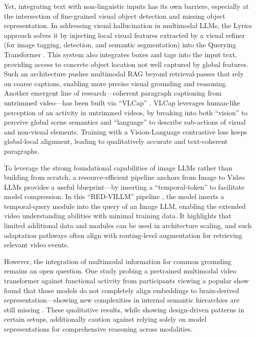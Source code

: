 \documentclass[11pt]{article}
\begin{document}
Yet, integrating text with non-linguistic inputs has its own barriers, especially at the intersection of fine-grained visual object detection and missing object representation. In addressing visual hallucination in multimodal LLMs, the Lyrics approach solves it by injecting local visual features extracted by a visual refiner (for image tagging, detection, and semantic segmentation) into the Querying Transformer \cite{ref200}. This system also integrates boxes and tags into the input text, providing access to concrete object location not well captured by global features. Such an architecture pushes multimodal RAG beyond retrieval-passes that rely on coarse captions, enabling more precise visual grounding and reasoning. Another emergent line of research---coherent paragraph captioning from untrimmed video---has been built via ``VLCap'' \cite{ref201}. VLCap leverages human-like perception of an activity in untrimmed videos, by breaking into both ``vision'' to perceive global scene semantics and ``language'' to describe sub-actions of visual and non-visual elements. Training with a Vision-Language contrastive loss keeps global-local alignment, leading to qualitatively accurate and text-coherent paragraphs.

To leverage the strong foundational capabilities of image LLMs rather than building from scratch, a resource-efficient pipeline anchors from Image to Video LLMs provides a useful blueprint---by inserting a ``temporal-token'' to facilitate model compression. In this ``RED-VILLM'' pipeline \cite{ref202}, the model inserts a temporal-query module into the query of an Image LLM, enabling the extended video understanding abilities with minimal training data. It highlights that limited additional data and modules can be used in architecture scaling, and such adaptation pathways often align with routing-level augmentation for retrieving relevant video events.

However, the integration of multimodal information for common grounding remains an open question. One study probing a pretrained multimodal video transformer against functional activity from participants viewing a popular show found that those models do not completely align embeddings to brain-derived representation---showing new complexities in internal semantic hierarchies are still missing \cite{ref203}. These qualitative results, while showing design-driven patterns in certain setups, additionally caution against relying solely on model representations for comprehensive reasoning across modalities.
\end{document}
